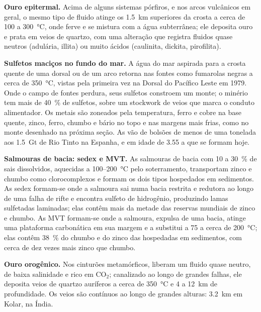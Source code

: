 \textbf{Ouro epitermal.} Acima de alguns sistemas pórfiros, e nos arcos vulcânicos em geral, o mesmo
tipo de fluido atinge os \qty{1.5}{km} superiores da crosta a cerca de 100 a \qty{300}{\celsius},
onde ferve e se mistura com a água subterrânea; ele deposita ouro e prata em veios de quartzo, com uma
alteração que registra fluidos quase neutros (adulária, illita) ou muito ácidos (caulinita,
dickita, pirofilita).

\textbf{Sulfetos maciços no fundo do mar.} A água do mar aspirada para a crosta quente de uma dorsal ou de
um arco retorna nas fontes como fumarolas negras a cerca de \qty{350}{\celsius}, vistas pela primeira vez na Dorsal do Pacífico
Leste em 1979. Onde o campo de fontes perdura, seus sulfetos constroem um monte; o minério tem mais de
\qty{40}{\percent} de sulfetos, sobre um stockwork de veios que marca o conduto alimentador. Os metais são zoneados
pela temperatura, ferro e cobre na base quente, zinco, ferro, chumbo e bário no topo e nas
margens mais frias, como no monte desenhado na próxima seção. As 
vão de bolsões de menos de uma tonelada aos \qty{1.5}{Gt} de Rio Tinto na Espanha, e em
idade de \qty{3.55}{\Ga} a  que se formam hoje.

\textbf{Salmouras de bacia: sedex e MVT.} As salmouras de bacia com 10 a \qty{30}{\percent} de sais dissolvidos,
aquecidas a 100--\qty{200}{\celsius} pelo soterramento, transportam zinco e chumbo como clorocomplexos e formam os
dois tipos hospedados em sedimentos. As  sedex formam-se onde a salmoura sai numa bacia restrita e redutora
ao longo de uma falha de rifte e encontra sulfeto de hidrogênio, produzindo lamas sulfetadas laminadas; elas contêm mais
da metade das reservas mundiais de zinco e chumbo. As  MVT formam-se onde a salmoura, expulsa de uma
bacia, atinge uma plataforma carbonática em sua margem e a substitui a 75 a cerca de
\qty{200}{\celsius}; elas contêm \qty{38}{\percent} do chumbo e do zinco das  hospedadas em sedimentos,
com cerca de dez vezes mais zinco que chumbo.

\textbf{Ouro orogênico.} Nos cinturões metamórficos,  liberam um fluido quase neutro,
de baixa salinidade e rico em CO$_2$; canalizado ao longo de grandes falhas, ele deposita veios de quartzo
auríferos a cerca de \qty{350}{\celsius} e 4 a \qty{12}{km} de profundidade. Os veios são contínuos ao longo de
grandes alturas: \qty{3.2}{km} em Kolar, na Índia.

